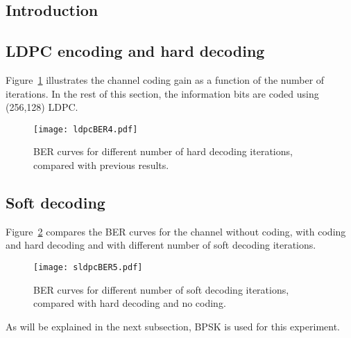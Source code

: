 \subsection{Introduction}

\subsection{LDPC encoding and hard decoding}
Figure~\ref{fig:ldpcBER} illustrates the channel coding gain as a function of the number of iterations.
In the rest of this section, the information bits are coded using (256,128) LDPC.
\begin{figure}[htbp]
    \centering
    \texttt{[image: ldpcBER4.pdf]}
    \caption{BER curves for different number of hard decoding iterations, compared with previous results.\label{fig:ldpcBER}}
\end{figure}

\subsection{Soft decoding}
Figure~\ref{fig:sldpcBER} compares the BER curves for the channel without coding, with coding and hard decoding and with different number of soft decoding iterations.
\begin{figure}[htbp]
    \centering
    \texttt{[image: sldpcBER5.pdf]}
    \caption{BER curves for different number of soft decoding iterations, compared with hard decoding and no coding.\label{fig:sldpcBER}}
\end{figure}
As will be explained in the next subsection, BPSK is used for this experiment.
